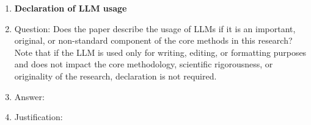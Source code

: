 \documentclass{article}
\begin{document}
\begin{enumerate}
\item {\bf Declaration of LLM usage}
    \item[] Question: Does the paper describe the usage of LLMs if it is an important, original, or non-standard component of the core methods in this research? Note that if the LLM is used only for writing, editing, or formatting purposes and does not impact the core methodology, scientific rigorousness, or originality of the research, declaration is not required.
    \item[] Answer: \answerTODO{} %
    \item[] Justification: \justificationTODO{}

\end{enumerate}
\end{document}
